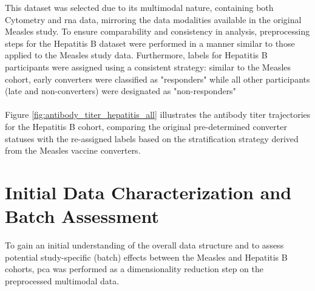 \documentclass[12pt,a4paper]{report}
\begin{document}
\noindent
This dataset was selected due to its multimodal nature, containing both Cytometry and \acrshort{rna} data, mirroring the data modalities available in the original Measles study. To ensure comparability and consistency in analysis, preprocessing steps for the Hepatitis B dataset were performed in a manner similar to those applied to the Measles study data. Furthermore, labels for Hepatitis B participants were assigned using a consistent strategy: similar to the Measles cohort, early converters were classified as "responders" while all other participants (late and non-converters) were designated as "non-responders"\\
\\
Figure \ref{fig:antibody_titer_hepatitis_all} illustrates the antibody titer trajectories for the Hepatitis B cohort, comparing the original pre-determined converter statuses with the re-assigned labels based on the stratification strategy derived from the Measles vaccine converters.

\section{Initial Data Characterization and Batch Assessment}
\noindent
To gain an initial understanding of the overall data structure and to assess potential study-specific (batch) effects between the Measles and Hepatitis B cohorts, \acrfull{pca} was performed as a dimensionality reduction step on the preprocessed multimodal data.\\
\end{document}
